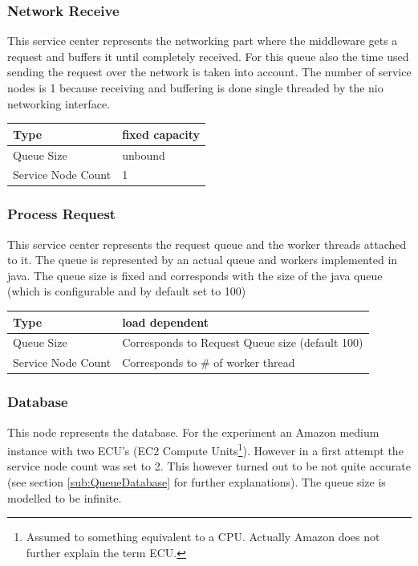 \documentclass[a4paper]{article}
\begin{document}
\subsubsection{Network Receive}
\label{subsub:ServiceCenterNetworkReceive}

This service center represents the networking part where the middleware gets a request and buffers it until completely received. For this queue also the time used sending the request over the network is taken into account. The number of service nodes is 1 because receiving and buffering is done single threaded by the nio networking interface.\\

\begin{tabular}{|l|l|}
\hline 
Type & fixed capacity \\ 
\hline 
Queue Size & unbound\\ 
\hline 
Service Node Count & 1 \\ 
\hline 
\end{tabular} 

\subsubsection{Process Request}
This service center represents the request queue and the worker threads attached to it. The queue is represented by an actual queue and workers implemented in java. The queue size is fixed and corresponds with the size of the java queue (which is configurable and by default set to 100) \\

\begin{tabular}{|l|l|}
\hline 
Type & load dependent \\ 
\hline 
Queue Size & Corresponds to Request Queue size (default 100)\\ 
\hline 
Service Node Count & Corresponds to \# of worker thread \\ 
\hline 
\end{tabular} 

\subsubsection{Database}
This node represents the database. For the experiment an Amazon medium instance with two ECU's (EC2 Compute Units\footnote{Assumed to something equivalent to a CPU. Actually Amazon does not further explain the term ECU.}). However in a first attempt the service node count was set to 2. This however turned out to be not quite accurate (see section \ref{sub:QueueDatabase} for further explanations).  The queue size is modelled to be infinite.\\
\end{document}
